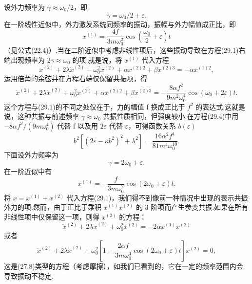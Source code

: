 设外力频率为 $\gamma\approx\omega_0/2$，即
\begin{equation*}
  \gamma=\omega_0/2+\varepsilon.
\end{equation*}
在一阶线性近似中，外力激发系统同频率的振动，振幅与外力幅值成正比，即
\begin{equation*}
  x^{(1)}=\frac{4f}{3m\omega_0^2}\cos\left(\frac{\omega_0}{2}+\varepsilon\right)t
\end{equation*}
（见公式(22.4)）.当在二阶近似中考虑非线性项后，这些振动导致在方程(29.1)右端出现频率为 $2\gamma\approx\omega_0$ 的项.就是说，将 $x^{(1)}$ 代入方程
\begin{equation*}
  \ddot{x}^{(2)}+2\lambda\dot{x}^{(2)}+\omega_0^2x^{(2)}
  +\alpha x^{(2)2}+\beta x^{(2)3}=-\alpha x^{(1)2},
\end{equation*}
运用倍角的余弦并在方程右端仅保留共振项，得
\begin{equation}
  \ddot{x}^{(2)}+2\lambda\dot{x}^{(2)}+\omega_0^2x^{(2)}
  +\alpha x^{(2)2}+\beta x^{(2)3}
  =-\frac{8\alpha f^2}{9m^2\omega_0^4}\cos\left(\omega_0+2\varepsilon\right)t.
\end{equation}
这个方程与(29.1)的不同之处仅在于，力的幅值 f 换成正比于 $f^2$ 的表达式.这就是说，这种共振与前述频率 $\gamma\approx\omega_0$ 共振性质相同，但强度较小.在方程(29.4)中用 $-8\alpha f^2/(9m\omega_0^4)$ 代替 f 以及用 $2\varepsilon$ 代替 $\varepsilon$，可得函数关系 $b(\varepsilon)$
\begin{equation}
  b^2\left[\left(2\varepsilon-\kappa b^2\right)^2+\lambda^2\right]
  =\frac{16\alpha^2f^4}{81m^4\omega_0^{10}}.
\end{equation}
下面设外力频率为
\begin{equation*}
  \gamma=2\omega_0+\varepsilon.
\end{equation*}
在一阶近似中有
\begin{equation*}
  x^{(1)}=-\frac{f}{3m\omega_0^2}\cos(2\omega_0+\varepsilon)t.
\end{equation*}
将 $x=x^{(1)}+x^{(2)}$ 代入方程(29.1)，我们得不到像前一种情况中出现的表示共振外力的项.然而，由于正比于乘积 $x^{(1)}x^{(2)}$ 的 3 阶项而产生参变共振.如果在所有非线性项中仅保留这一项，则得 $x^{(2)}$ 的方程：
\begin{equation*}
  \ddot{x}^{(2)}+2\lambda\dot{x}^{(2)}+\omega_0^2x^{(2)}=-2\alpha x^{(1)}x^{(2)}
\end{equation*}
或者
\begin{equation}
  \ddot{x}^{(2)}+2\lambda\dot{x}^{(2)}
  +\omega_0^2\left[1-\frac{2\alpha f}{3m\omega_0^4}\cos\left(2\omega_0+\varepsilon\right)t\right]x^{(2)}=0,
\end{equation}
这是(27.8)类型的方程（考虑摩擦），如我们已看到的，它在一定的频率范围内会导致振动不稳定.

